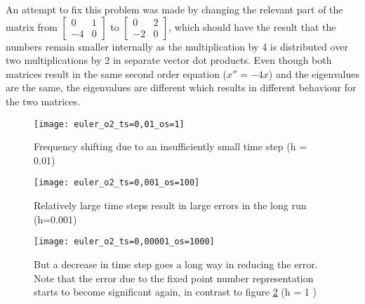 An attempt to fix this problem was made by changing the relevant part of the matrix from $\left[ \begin{smallmatrix} 0 & 1\\ -4 & 0 \end{smallmatrix} \right]$ to $\left[ \begin{smallmatrix} 0 & 2\\ -2 & 0 \end{smallmatrix} \right]$, which should have the result that the numbers remain smaller internally as the multiplication by 4 is distributed over two multiplications by 2 in separate vector dot products. Even though both matrices result in the same second order equation ($x'' = -4x$) and the eigenvalues are the same, the eigenvalues are different which results in different behaviour for the two matrices.  

\begin{figure}[h]
	\centering
	\texttt{[image: euler\_o2\_ts=0,01\_os=1]}
	\caption{Frequency shifting due to an insufficiently small time step (h = 0.01)}
	\label{f:euler_o2_ts=0,01_os=1}
\end{figure}

\begin{figure}[p]
	\centering
	\texttt{[image: euler\_o2\_ts=0,001\_os=100]}
	\caption{Relatively large time steps result in large errors in the long run (h=0.001)}
	\label{f:euler_o2_ts=0,001_os=100}
\end{figure}

\begin{figure}[p]
	\centering
	\texttt{[image: euler\_o2\_ts=0,00001\_os=1000]}
	\caption{But a decrease in time step goes a long way in reducing the error. Note that the error due to the fixed point number representation starts to become significant again, in contrast to figure \ref{f:euler_o2_ts=0,001_os=100} (h = 1 )}
	\label{f:euler_o2_ts=0,00001_os=1000}
\end{figure}

